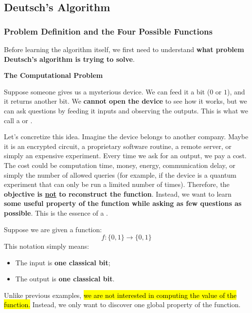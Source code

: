 \subsection{Deutsch's Algorithm}\label{ex:deutschs-algorithm}

\subsubsection{Problem Definition and the Four Possible Functions}\label{ex:problem-definition-and-the-four-possible-functions}

Before learning the algorithm itself, we first need to understand \textbf{what problem Deutsch's algorithm is trying to solve}.

\highspace
\begin{flushleft}
    \textcolor{Red2}{ \textbf{The Computational Problem}}
\end{flushleft}
Suppose someone gives us a mysterious device. We can feed it a bit ($0$ or $1$), and it returns another bit. We \textbf{cannot open the device} to see how it works, but we can ask questions by feeding it inputs and observing the outputs. This is what we call a  or .

\highspace
Let's concretize this idea. Imagine the device belongs to another company. Maybe it is an encrypted circuit, a proprietary software routine, a remote server, or simply an expensive experiment. Every time we ask for an output, we pay a cost. The cost could be computation time, money, energy, communication delay, or simply the number of allowed queries (for example, if the device is a quantum experiment that can only be run a limited number of times). Therefore, the \textbf{objective is \underline{not} to reconstruct the function}. Instead, we want to learn \textbf{some useful property of the function while asking as few questions as possible}. This is the essence of a .

\highspace
Suppose we are given a function:
\begin{equation*}
    f : \{0, 1\} \to \{0, 1\}
\end{equation*}
This notation simply means:
\begin{itemize}
    \item The input is \textbf{one classical bit};
    \item The output is \textbf{one classical bit}.
\end{itemize}
Unlike previous examples, \hl{we are not interested in computing the value of the function.} Instead, we only want to discover one global property of the function.

